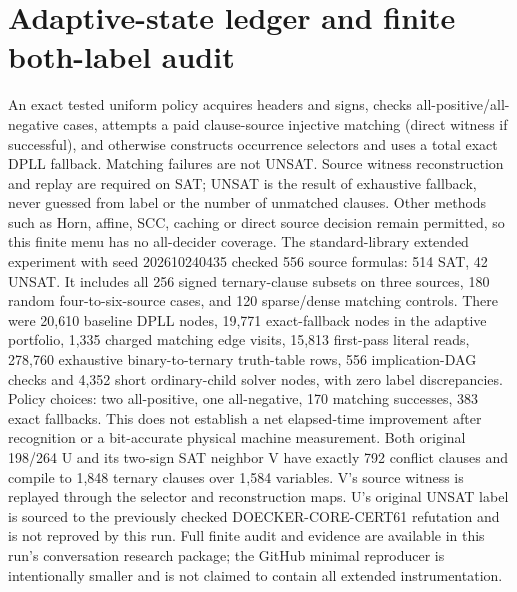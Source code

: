 \documentclass[11pt]{article}
\begin{document}
\section{Adaptive-state ledger and finite both-label audit}
An exact tested uniform policy acquires headers and signs, checks all-positive/all-negative cases, attempts a paid clause-source injective matching (direct witness if successful), and otherwise constructs occurrence selectors and uses a total exact DPLL fallback. Matching failures are not UNSAT. Source witness reconstruction and replay are required on SAT; UNSAT is the result of exhaustive fallback, never guessed from label or the number of unmatched clauses. Other methods such as Horn, affine, SCC, caching or direct source decision remain permitted, so this finite menu has no all-decider coverage.
The standard-library extended experiment with seed 202610240435 checked 556 source formulas: 514 SAT, 42 UNSAT. It includes all 256 signed ternary-clause subsets on three sources, 180 random four-to-six-source cases, and 120 sparse/dense matching controls. There were 20,610 baseline DPLL nodes, 19,771 exact-fallback nodes in the adaptive portfolio, 1,335 charged matching edge visits, 15,813 first-pass literal reads, 278,760 exhaustive binary-to-ternary truth-table rows, 556 implication-DAG checks and 4,352 short ordinary-child solver nodes, with zero label discrepancies. Policy choices: two all-positive, one all-negative, 170 matching successes, 383 exact fallbacks. This does not establish a net elapsed-time improvement after recognition or a bit-accurate physical machine measurement.
Both original 198/264 U and its two-sign SAT neighbor V have exactly 792 conflict clauses and compile to 1,848 ternary clauses over 1,584 variables. V's source witness is replayed through the selector and reconstruction maps. U's original UNSAT label is sourced to the previously checked DOECKER-CORE-CERT61 refutation and is not reproved by this run. Full finite audit and evidence are available in this run's conversation research package; the GitHub minimal reproducer is intentionally smaller and is not claimed to contain all extended instrumentation.
\end{document}

